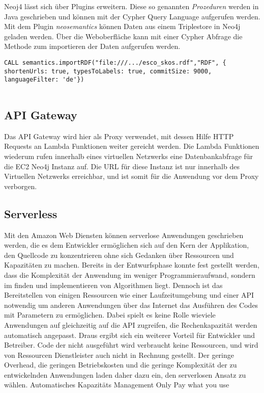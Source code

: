 Neoj4 lässt sich über Plugins erweitern. Diese so genannten \textit{Prozeduren} werden in Java geschrieben und können mit der Cypher Query Language aufgerufen werden.
Mit dem Plugin \textit{neosemantics} können Daten aus einem Triplestore in Neo4j geladen werden. Über die Weboberfläche kann mit einer Cypher Abfrage die Methode zum importieren der Daten aufgerufen werden. 

\lstset{language=xml}
\lstset{language=java}
\lstset{breaklines=true}
\begin{lstlisting}[frame=htrbl, caption={importRDF Prozeduraufruf}, label={lst:importRDF}]
CALL semantics.importRDF("file:///.../esco_skos.rdf","RDF", { shortenUrls: true, typesToLabels: true, commitSize: 9000, languageFilter: 'de'})


\end{lstlisting}


\subsection{API Gateway}

Das API Gateway wird hier als Proxy verwendet, mit dessen Hilfe HTTP Requests an Lambda Funktionen weiter gereicht werden. Die Lambda Funktionen wiederum rufen innerhalb eines virtuellen Netzwerks eine Datenbankabfrage für die EC2 Neo4j Instanz auf. Die URL für diese Instanz ist nur innerhalb des Virtuellen Netzwerks erreichbar, und ist somit für die Anwendung vor dem Proxy verborgen. 

\subsection{Serverless}

Mit den Amazon Web Diensten können serverlose Anwendungen geschrieben werden, die es dem Entwickler ermöglichen sich auf den Kern der Applikation, den Quellcode zu konzentrieren ohne sich Gedanken über Ressourcen und Kapazitäten zu machen. Bereits in der Entwurfsphase konnte fest gestellt werden, dass die Komplexität der Anwendung im weniger Programmieraufwand, sondern im finden und implementieren von Algorithmen liegt. Dennoch ist das Bereitstellen von einigen Ressourcen wie einer Laufzeitumgebung und einer API notwendig um anderen Anwendungen über das Internet das Ausführen des Codes mit Parametern zu ermöglichen. Dabei spielt es keine Rolle wieviele Anwendungen auf gleichzeitig auf die API zugreifen, die Rechenkapazität werden automatisch angepasst. Draus ergibt sich ein weiterer Vorteil für Entwickler und Betreiber. Code der nicht ausgeführt wird verbraucht keine Ressourcen, und wird von Ressourcen Dienstleister auch nicht in Rechnung gestellt. 
Der geringe Overhead, die geringen Betriebskosten und die geringe Komplexität der zu entwickelnden Anwendungen laden daher dazu ein, den serverlosen Ansatz zu wählen. 
Automatisches Kapazitäts Management
Only Pay what you use
 


